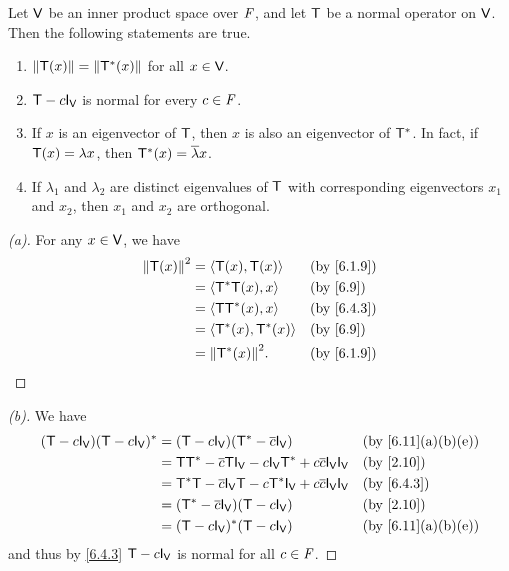 \begin{thm}\label{6.15}
  Let \(\mathsf{V}\) be an inner product space over \(\mathit{F}\), and let \(\mathsf{T}\) be a normal operator on \(\mathsf{V}\).
  Then the following statements are true.
  \begin{enumerate}
    \item \(\left\lVert\mathsf{T}(x)\right\rVert = \left\lVert\mathsf{T}^*(x)\right\rVert\) for all \(x \in \mathsf{V}\).
    \item \(\T - c \IT[\V]\) is normal for every \(c \in \mathit{F}\).
    \item If \(x\) is an eigenvector of \(\mathsf{T}\), then \(x\) is also an eigenvector of \(\mathsf{T}^*\).
          In fact, if \(\mathsf{T}(x) = \lambda x\), then \(\mathsf{T}^*(x) = \overline{\lambda} x\).
    \item If \(\lambda_1\) and \(\lambda_2\) are distinct eigenvalues of \(\mathsf{T}\) with corresponding eigenvectors \(x_1\) and \(x_2\), then \(x_1\) and \(x_2\) are orthogonal.
  \end{enumerate}
\end{thm}

\begin{proof}[(a)]
  For any \(x \in \mathsf{V}\), we have
  \begin{align*}
    \norm{\T(x)}^2 & = \inn{\T(x), \T(x)}     &  & \by{6.1.9} \\
                   & = \inn{\T^* \T(x), x}    &  & \by{6.9}   \\
                   & = \inn{\T \T^*(x), x}    &  & \by{6.4.3} \\
                   & = \inn{\T^*(x), \T^*(x)} &  & \by{6.9}   \\
                   & = \norm{\T^*(x)}^2.      &  & \by{6.1.9}
  \end{align*}
\end{proof}

\begin{proof}[(b)]
  We have
  \begin{align*}
    (\T - c \IT[\V]) (\T - c \IT[\V])^* & = (\T - c \IT[\V]) (\T^* - \conj{c} \IT[\V])                                  &  & \by{6.11}[a,b,e] \\
                                        & = \T \T^* - \conj{c} \T \IT[\V] - c \IT[\V] \T^* + c \conj{c} \IT[\V] \IT[\V] &  & \by{2.10}        \\
                                        & = \T^* \T - \conj{c} \IT[\V] \T - c \T^* \IT[\V] + c \conj{c} \IT[\V] \IT[\V] &  & \by{6.4.3}       \\
                                        & = (\T^* - \conj{c} \IT[\V]) (\T - c \IT[\V])                                  &  & \by{2.10}        \\
                                        & = (\T - c \IT[\V])^* (\T - c \IT[\V])                                         &  & \by{6.11}[a,b,e]
  \end{align*}
  and thus by \cref{6.4.3} \(\T - c \IT[\V]\) is normal for all \(c \in \mathit{F}\).
\end{proof}


